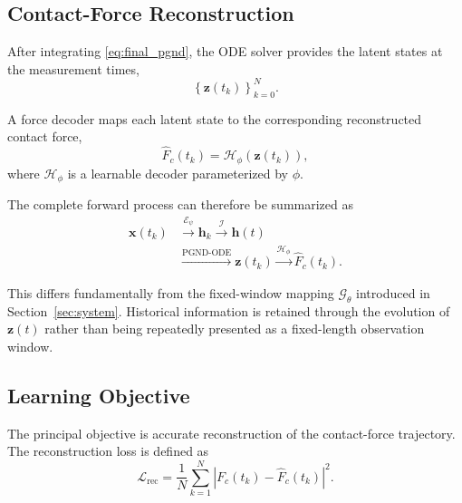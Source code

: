 \documentclass[journal,twoside]{IEEEtran}
\begin{document}
\subsection{Contact-Force Reconstruction}
\label{subsec:force_reconstruction}

After integrating \eqref{eq:final_pgnd}, the ODE solver provides the latent
states at the measurement times,
\begin{equation}
    \left\{
        \mathbf{z}(t_k)
    \right\}_{k=0}^{N}.
    \label{eq:latent_trajectory}
\end{equation}

A force decoder maps each latent state to the corresponding reconstructed
contact force,
\begin{equation}
    \hat{F}_{c}(t_k)
    =
    \mathcal{H}_{\phi}
    \left(
        \mathbf{z}(t_k)
    \right),
    \label{eq:force_decoder}
\end{equation}
where $\mathcal{H}_{\phi}$ is a learnable decoder parameterized by $\phi$.

The complete forward process can therefore be summarized as
\begin{equation}
\begin{aligned}
    \mathbf{x}(t_k)
    &\xrightarrow{\mathcal{E}_{\psi}}
    \mathbf{h}_k
    \xrightarrow{\mathcal{I}}
    \mathbf{h}(t)\\
    &\xrightarrow{\mathrm{PGND\text{-}ODE}}
    \mathbf{z}(t_k)
    \xrightarrow{\mathcal{H}_{\phi}}
    \hat{F}_{c}(t_k).
\end{aligned}
\label{eq:complete_pipeline}
\end{equation}

This differs fundamentally from the fixed-window mapping
$\mathcal{G}_{\theta}$ introduced in
Section~\ref{sec:system}. Historical information is retained through the
evolution of $\mathbf{z}(t)$ rather than being repeatedly presented as a
fixed-length observation window.




\subsection{Learning Objective}
\label{subsec:objective}

The principal objective is accurate reconstruction of the contact-force
trajectory. The reconstruction loss is defined as
\begin{equation}
    \mathcal{L}_{\mathrm{rec}}
    =
    \frac{1}{N}
    \sum_{k=1}^{N}
    \left|
        F_c(t_k)-\hat{F}_c(t_k)
    \right|^2.
    \label{eq:reconstruction_loss}
\end{equation}
\end{document}
